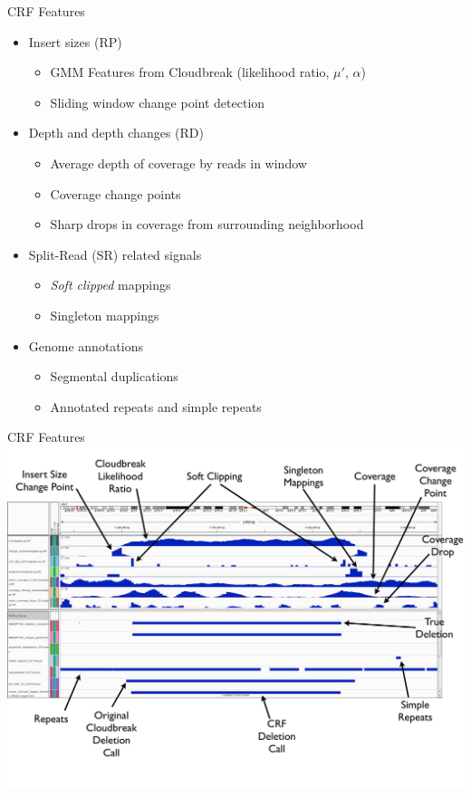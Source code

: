 \documentclass{beamer}
\begin{document}
\begin{frame}{CRF Features}
  \begin{itemize}
  \item Insert sizes (RP)
    \begin{itemize}
      \item GMM Features from Cloudbreak (likelihood ratio, $\mu'$, $\alpha$)
      \item Sliding window change point detection      
\vspace{.5mm}
  \def\svgwidth{.75\textwidth}
        
    \end{itemize}
  \item Depth and depth changes (RD)
    \begin{itemize}
      \item Average depth of coverage by reads in window
      \item Coverage change points
      \item Sharp drops in coverage from surrounding neighborhood
    \end{itemize}
  \item Split-Read (SR) related signals
    \begin{itemize}
      \item \emph{Soft clipped} mappings 
      \item Singleton mappings
    \end{itemize}
  \item Genome annotations
    \begin{itemize}
      \item Segmental duplications
      \item Annotated repeats and simple repeats
    \end{itemize}
  \end{itemize}
\end{frame}

\begin{frame}{CRF Features}
  \includegraphics[height=0.9\textheight,keepaspectratio]{true_example_with_features.pdf}
\end{frame}
\end{document}
